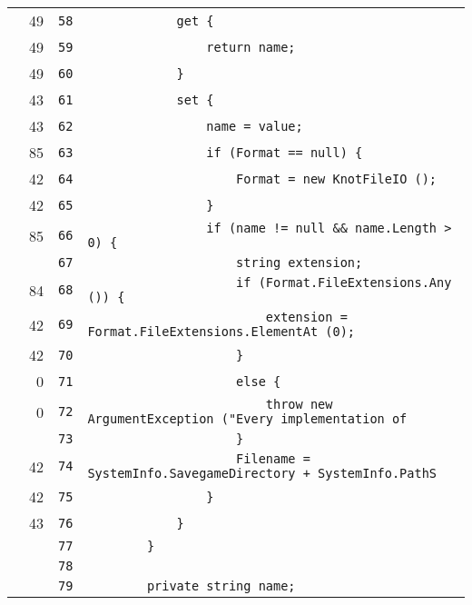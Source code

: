 \documentclass[a4paper,10pt]{article}
\begin{document}
\begin{longtable}[l]{lrrl}
\cellcolor{green} & 49 & \verb~58~ & \verb~            get {~\\
\cellcolor{green} & 49 & \verb~59~ & \verb~                return name;~\\
\cellcolor{green} & 49 & \verb~60~ & \verb~            }~\\
\cellcolor{green} & 43 & \verb~61~ & \verb~            set {~\\
\cellcolor{green} & 43 & \verb~62~ & \verb~                name = value;~\\
\cellcolor{green} & 85 & \verb~63~ & \verb~                if (Format == null) {~\\
\cellcolor{green} & 42 & \verb~64~ & \verb~                    Format = new KnotFileIO ();~\\
\cellcolor{green} & 42 & \verb~65~ & \verb~                }~\\
\cellcolor{green} & 85 & \verb~66~ & \verb~                if (name != null && name.Length > 0) {~\\
\cellcolor{gray} &  & \verb~67~ & \verb~                    string extension;~\\
\cellcolor{green} & 84 & \verb~68~ & \verb~                    if (Format.FileExtensions.Any ()) {~\\
\cellcolor{green} & 42 & \verb~69~ & \verb~                        extension = Format.FileExtensions.ElementAt (0);~\\
\cellcolor{green} & 42 & \verb~70~ & \verb~                    }~\\
\cellcolor{red} & 0 & \verb~71~ & \verb~                    else {~\\
\cellcolor{red} & 0 & \verb~72~ & \verb~                        throw new ArgumentException ("Every implementation of ~\\
\cellcolor{gray} &  & \verb~73~ & \verb~                    }~\\
\cellcolor{green} & 42 & \verb~74~ & \verb~                    Filename = SystemInfo.SavegameDirectory + SystemInfo.PathS~\\
\cellcolor{green} & 42 & \verb~75~ & \verb~                }~\\
\cellcolor{green} & 43 & \verb~76~ & \verb~            }~\\
\cellcolor{gray} &  & \verb~77~ & \verb~        }~\\
\cellcolor{gray} &  & \verb~78~ & \verb~~\\
\cellcolor{gray} &  & \verb~79~ & \verb~        private string name;~\\

\end{longtable}
\end{document}

